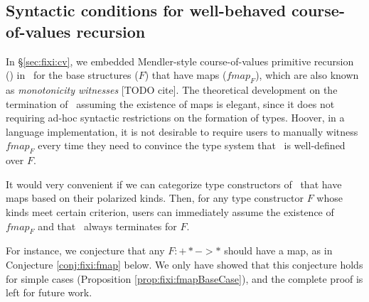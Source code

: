 \subsection{Syntactic conditions for well-behaved course-of-values recursion}
\label{ssec:fixi:theory:cv}
In \S\ref{sec:fixi:cv}, we embedded Mendler-style course-of-values
primitive recursion (\McvPr) in \Fixi\ for the base structures ($F$)
that have maps ($\textit{fmap}_F$), which are also known as
\emph{monotonicity witnesses} [TODO cite]. The theoretical development on
the termination of \McvPr\ assuming the existence of maps is elegant, since
it does not requiring ad-hoc syntactic restrictions on the formation of types.
Hoover, in a language implementation, it is not desirable to require users to
manually witness $\textit{fmap}_F$ every time they need to convince
the type system that \McvPr\ is well-defined over $F$.

It would very convenient if we can categorize type constructors of \Fixi\ that
have maps based on their polarized kinds. Then, for any type constructor $F$
whose kinds meet certain criterion, users can immediately assume the existence
of $\textit{fmap}_F$ and that \McvPr\ always terminates for $F$.

For instance, we conjecture that any $F: +* -> *$ should have a map, as in
Conjecture \ref{conj:fixi:fmap} below. We only have showed
that this conjecture holds for simple cases
(Proposition \ref{prop:fixi:fmapBaseCase}), and
the complete proof is left for future work.

